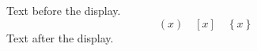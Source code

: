 \documentclass{article}
\begin{document}
Text before the display.
\[
  \left( x \right) \quad \left[ x \right] \quad \left\{ x \right\}
\]
Text after the display.
\end{document}
